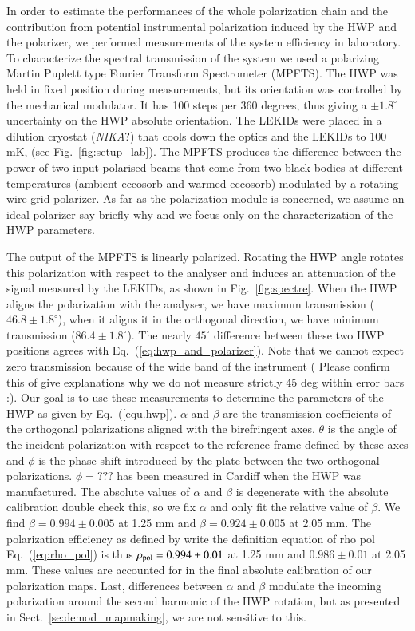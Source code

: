 \documentclass[twocolumn,traditabstract]{aa}
\newcommand{\nika}{{\it NIKA}}
\begin{document}
{In order to estimate the performances of the whole polarization chain and the
contribution from potential instrumental polarization induced by the HWP and the
polarizer, we performed measurements of the system efficiency in laboratory. To
characterize the spectral transmission of the system we used a polarizing Martin
Puplett type Fourier Transform Spectrometer (MPFTS). The HWP was held in fixed
position during measurements, but its orientation was controlled by the
mechanical modulator. It has 100 steps per 360 degrees, thus giving a $\pm
1.8^{\circ}$ uncertainty on the HWP absolute orientation. The LEKIDs were placed
in a dilution cryostat {\color{red} (\nika?)} that cools down the optics and the
LEKIDs to 100 mK, (see Fig.~\ref{fig:setup_lab}). The MPFTS produces the
difference between the power of two input polarised beams that come from two
black bodies at different temperatures (ambient eccosorb and warmed eccosorb)
modulated by a rotating wire-grid polarizer. As far as the polarization module
is concerned, we assume an ideal polarizer {\color{red} say briefly why} and we
focus only on the characterization of the HWP parameters.

The output of the MPFTS is linearly polarized. Rotating the HWP angle rotates
this polarization with respect to the analyser and induces an attenuation of the
signal measured by the LEKIDs, as shown in Fig.~\ref{fig:spectre}. When the HWP
aligns the polarization with the analyser, we have maximum transmission ($46.8
\pm 1.8^{\circ}$), when it aligns it in the orthogonal direction, we have
minimum transmission ($86.4\pm1.8^\circ$). The nearly $45^\circ$ difference
between these two HWP positions agrees with
Eq.~(\ref{eq:hwp_and_polarizer}). Note that we cannot expect zero transmission
because of the wide band of the instrument ({\color{red} Please confirm this of
  give explanations why we do not measure strictly 45 deg within error bars
  :)}. Our goal is to use these measurements to determine the parameters of the
HWP as given by Eq.~(\ref{equ.hwp}). $\alpha$ and $\beta$ are the transmission
coefficients of the orthogonal polarizations aligned with the birefringent
axes. $\theta$ is the angle of the incident polarization with respect to the
reference frame defined by these axes and {$\phi$} is the phase shift introduced
by the plate between the two orthogonal polarizations. {\color{red} $\phi =
  ???$} has been measured in Cardiff when the HWP was manufactured. The absolute
values of $\alpha$ and $\beta$ is degenerate with the absolute calibration
{\color{red} double check this}, so we fix $\alpha$ and only fit the relative
value of $\beta$. We find $\beta = 0.994\pm0.005$ at 1.25 mm and $\beta =
0.924\pm0.005$ at 2.05 mm. The polarization efficiency as defined by
{\color{red} write the definition equation of rho pol} Eq.~(\ref{eq:rho_pol}) is
thus $\rho_{\rm pol} = 0.994 \pm 0.01$ at 1.25 mm and $0.986 \pm 0.01$ at 2.05
mm. These values are accounted for in the final absolute calibration of our
polarization maps. Last, differences between $\alpha$ and $\beta$ modulate the
incoming polarization around the second harmonic of the HWP rotation, but as
presented in Sect.~\ref{se:demod_mapmaking}, we are not sensitive to this.

}
\end{document}
